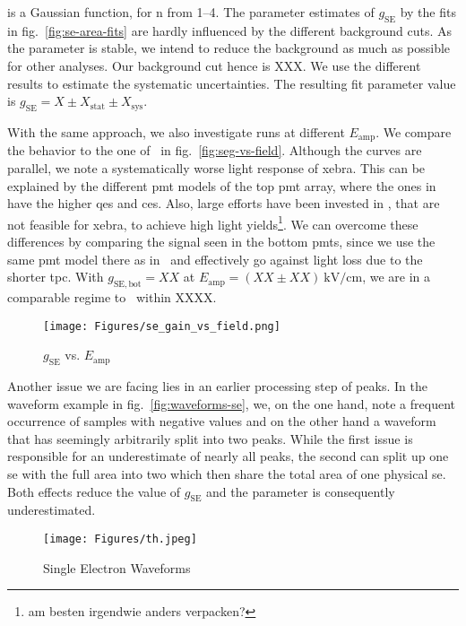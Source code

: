 is a Gaussian function, for n from \numrange{1}{4}.
The parameter estimates of $ g_\mathrm{SE} $ by the fits in fig.~\ref{fig:se-area-fits} are hardly influenced by the different background cuts.
As the parameter is stable, we intend to reduce the background as much as possible for other analyses.
Our background cut hence is XXX.  %
We use the different results to estimate the systematic uncertainties.
The resulting fit parameter value is $ g_\mathrm{SE} = X \pm X_\mathrm{stat} \pm X_\mathrm{sys} $.  %


With the same approach, we also investigate runs at different $ E_\mathrm{amp} $.
We compare the behavior to the one of \oneton~in fig.~\ref{fig:seg-vs-field}.
Although the curves are parallel, we note a systematically worse light response of \gls{xebra}.
This can be explained by the different \gls{pmt} models of the top \gls{pmt} array, where the ones in \oneton have the higher \glspl{qe} and \glspl{ce}.
Also, large efforts have been invested in \oneton, that are not feasible for \gls{xebra}, to achieve high light yields\footnote{am besten irgendwie anders verpacken?}.
We can overcome these differences by comparing the signal seen in the bottom \glspl{pmt}, since we use the same \gls{pmt} model there as in \oneton~and effectively go against light loss due to the shorter \gls{tpc}.
With $ g_\mathrm{SE, bot} = XX $ at $ E_\mathrm{amp} = \left( XX \pm XX \right) \SI{}{\kilo\volt\per\centi\meter} $, we are in a comparable regime to \oneton~within XXXX.  %


\begin{figure}
    \centering
    \texttt{[image: Figures/se\_gain\_vs\_field.png]}  %
    \caption[\oneton comparison of Amplification Gain vs. Fieldstrength]{
        $ g_\mathrm{SE} $ vs. $ E_\mathrm{amp} $
    }
\end{figure}
    \label{fig:seg-vs-field}


Another issue we are facing lies in an earlier processing step of peaks.
In the waveform example in fig.~\ref{fig:waveforms-se}, we, on the one hand, note a frequent occurrence of samples with negative values and on the other hand a waveform that has seemingly arbitrarily split into two peaks.
While the first issue is responsible for an underestimate of nearly all peaks, the second can split up one \gls{se} with the full area into two which then share the total area of one physical \gls{se}.
Both effects reduce the value of $ g_\mathrm{SE} $ and the parameter is consequently underestimated.


\begin{figure}
    \centering
    \texttt{[image: Figures/th.jpeg]}  %
    \caption[Single Electrons Waveforms]{
        Single Electron Waveforms
    }
\end{figure}


